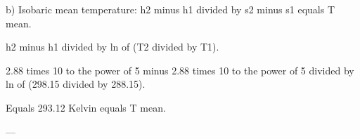 b) Isobaric mean temperature:  
h2 minus h1 divided by s2 minus s1 equals T mean.  

h2 minus h1 divided by ln of (T2 divided by T1).  

2.88 times 10 to the power of 5 minus 2.88 times 10 to the power of 5 divided by ln of (298.15 divided by 288.15).  

Equals 293.12 Kelvin equals T mean.  

---